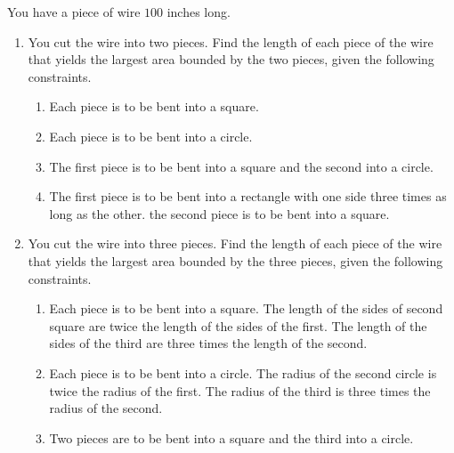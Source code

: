 \begin{ProblemSection}
  \begin{embeddedproblem}
    You have a piece of wire $100$ inches long.
    \begin{enumerate}[label={\bf{}(\alph*)}]
    \item You cut the wire into two pieces.  Find the length of each
      piece of the wire that yields the largest area bounded by the
      two pieces, given the following constraints.
      \begin{enumerate}[label={\bf{}(\roman*)}]
      \item Each piece is to be bent into a square.
      \item Each piece is to be bent into a circle.
      \item The first piece is to be bent into a square and the second
        into a circle. 
      \item The first piece is to be bent into a rectangle with one
        side three times as long as the other.  the second piece is to
        be bent into a square.
      \end{enumerate}
    \item You cut the wire into three pieces.  Find the length of each
      piece of the wire that yields the largest area bounded by the three
      pieces, given the following constraints.
      \begin{enumerate}[label={\bf{}(\roman*)}]
      \item Each piece is to be bent into a square. The length of the sides of
        second square are twice the length of the sides of the
        first. The length of the sides of the third are three times
        the length of the second.
      \item Each piece is to be bent into a circle. The radius of the
        second circle is twice the radius of the first. The radius of
        the third is three times the radius of the second.
      \item Two pieces are to be bent into a square and the third into
        a circle.
      \end{enumerate}
    \end{enumerate}
  \end{embeddedproblem}



\end{ProblemSection}
